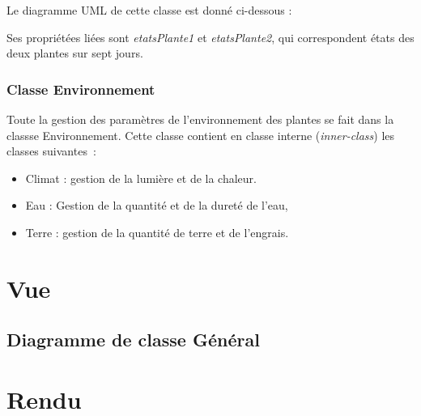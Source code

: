 \documentclass[a4paper,10pt]{article}
\begin{document}
Le diagramme UML de cette classe est donné ci-dessous :

Ses propriétées liées sont \textit{etatsPlante1} et \textit{etatsPlante2}, qui correspondent états des deux plantes
sur sept jours.


\subsubsection{Classe Environnement}
Toute la gestion des paramètres de l'environnement des plantes se fait dans la classse Environnement.
Cette classe contient en classe interne (\textit{inner-class}) les classes suivantes~:
\begin{itemize}
	\item Climat : gestion de la lumière et de la chaleur.
	\item Eau : Gestion de la quantité et de la dureté de l'eau,
	\item Terre : gestion de la quantité de terre et de l'engrais.
\end{itemize}
\section{Vue}
\subsection{Diagramme de classe Général}
\section{Rendu}
\end{document}
